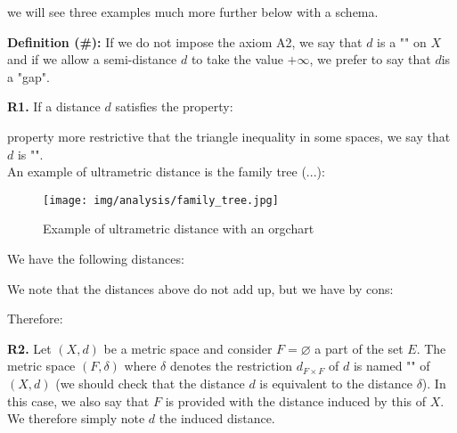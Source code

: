 	we will see three examples much more further below with a schema.
	
	\textbf{Definition (\#\mydef):} If we do not impose the axiom A2, we say that $d$ is a "" on $X$ and if we allow a semi-distance $d$ to take the value $+\infty$, we prefer to say that $d$is a "gap".
	\begin{tcolorbox}[title=Remarks,colframe=black,arc=10pt]
		\textbf{R1.} If a distance $d$ satisfies the property:
		
		property more restrictive that the triangle inequality in some spaces, we say that $d$ is "".\\
		
		An example of ultrametric distance is the family tree (...):
		
		\begin{figure}[H]
			\centering
			\texttt{[image: img/analysis/family\_tree.jpg]}
			\caption{Example of ultrametric distance with an orgchart}
		\end{figure}
		We have the following distances:
		
		We note that the distances above do not add up, but we have by cons:
		
		Therefore:
		
		
		\textbf{R2.} Let $(X, d)$ be a metric space and consider $F=\varnothing$ a part of the set $E$. The metric space $(F,\delta)$ where $\delta$ denotes the restriction $d_{F \times F}$ of $d$ is named "" of $(X, d)$ (we should check that the distance $d$ is equivalent to the distance $\delta$). In this case, we also say that $F$ is provided with the distance induced by this of $X$. We therefore simply note $d$ the induced distance.
	\end{tcolorbox}

